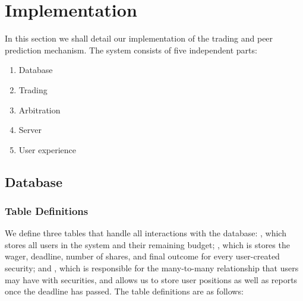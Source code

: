 \section{Implementation}

\label{sec:implementation}

In this section we shall detail our implementation of the trading and peer
prediction mechanism. The system consists of five independent parts:

\begin{enumerate}
	\item Database
	\item Trading
	\item Arbitration
	\item Server
	\item User experience
\end{enumerate}

\subsection{Database}

\label{sec:database}

\subsubsection{Table Definitions}

We define three tables that handle all interactions with the database:
, which stores all users in the system and their remaining budget;
, which is stores the wager, deadline, number of shares, and
final outcome for every user-created security; and , which
is responsible for the many-to-many relationship that users may have with
securities, and allows us to store user positions as well as reports once the
deadline has passed. The table definitions are as follows:

